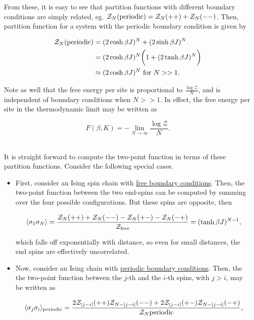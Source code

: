 \documentclass{homework}
\begin{document}
\begin{itemize}
    From these, it is easy to see that partition functions with different boundary conditions are simply related, eg. $\mathcal{Z}_N(\textnormal{periodic}) = \mathcal{Z}_N(++) + \mathcal{Z}_N(--)$. Then, partition function for a system with the periodic boundary condition is given by 
    
    \begin{equation}
        \begin{split}
          \mathcal{Z}_N(\textnormal{periodic}) &= (2\cosh \beta J)^N + (2\sinh \beta J)^N \\
          &= (2\cosh \beta J)^N \bigg(1+ (2\tanh \beta J)^N\bigg) \\
          &\approx (2\cosh \beta J)^N \textnormal{ for } N >> 1. 
        \end{split}
    \end{equation}
\end{itemize}

Note as well that the free energy per site is proportional to $\frac{\log \mathcal{Z}}{N}$, and is independent of boundary conditions when $N >> 1$. In effect, the free energy per site in the thermodynamic limit may be written as

\begin{equation}
    F(\beta, K) = - \lim_{N \rightarrow \infty} \frac{\log \mathcal{Z}}{N}.
\end{equation}

\blanky \\

It is straight forward to compute the two-point function in terms of these partition functions. Consider the following special cases.

\begin{itemize}
    \item First, consider an Ising spin chain with \underline{free boundary conditions}. Then, the two-point function between the two end-spins can be computed by summing over the four possible configurations. But these spins are opposite, then 

\begin{equation}
    \langle \sigma_1 \sigma_N \rangle = \frac{\mathcal{Z}_N(++) + \mathcal{Z}_N(--) - \mathcal{Z}_N(+-) - \mathcal{Z}_N(-+)}{\mathcal{Z}_{\textnormal{free}}} =
    (\tanh \beta J)^{N-1},
    \end{equation}
    
   which falls off exponentially with distance, so even for small distances, the end spins are effectively uncorrelated.
  \\
   \item Now, consider an Ising chain with \underline{periodic boundary conditions}. Then, the the two-point function between the $j$-th and the $i$-th spins, with $j>i$, may be written as

    \begin{equation}
       \langle \sigma_j \sigma_i \rangle_{\textnormal{periodic}} =  \frac{2 \mathcal{Z}_{|j-i|}(++)\mathcal{Z}_{N-|j-i|}(--) + 2\mathcal{Z}_{|j-i|}(+-) \mathcal{Z}_{N-|j-i|}(-+)}{\mathcal{Z}_N{\textnormal{periodic}}},
    \end{equation}
\end{itemize}
\end{document}

